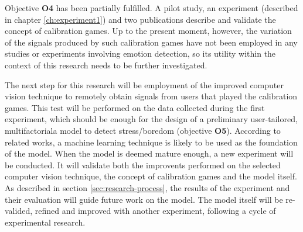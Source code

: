 Objective \textbf{O4} has been partially fulfilled. A pilot study, an experiment (described in chapter \ref{ch:experiment1}) and two publications \parencite{bevilacqua2016variations,bevilacqua2017changes} describe and validate the concept of calibration games. Up to the present moment, however, the variation of the signals produced by such calibration games have not been employed in any studies or experiments involving emotion detection, so its utility within the context of this research needs to be further investigated.

The next step for this research will be employment of the improved computer vision technique to remotely obtain signals from users that played the calibration games. This test will be performed on the data collected during the first experiment, which should be enough for the design of  a preliminary user-tailored, multifactoriala model to detect stress/boredom (objective \textbf{O5}). According to related works, a machine learning technique is likely to be used as the foundation of the model. When the model is deemed mature enough, a new experiment will be conducted. It will validate both the improvents performed on the selected computer vision technique, the concept of calibration games and the model itself. As described in section \ref{sec:research-process}, the results of the experiment and their evaluation will guide future work on the model. The model itself will be re-valided, refined and improved with another experiment, following a cycle of experimental research.
